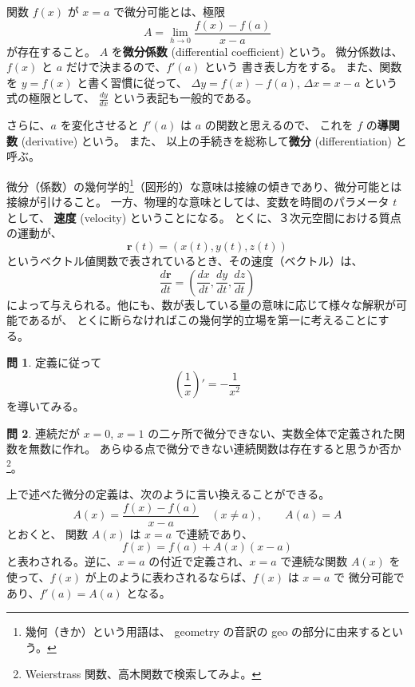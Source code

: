 \documentclass[a4paper]{jsarticle}
\theoremstyle{definition}
\newtheorem{Exercise}{問}%
\theoremstyle{remark}
\begin{document}
関数 $f(x)$ が $x=a$ で微分可能とは、極限
\[
A = \lim_{h\to 0} \frac{f(x)-f(a)}{x-a}
\]
が存在すること。
$A$ を{\bf 微分係数} (differential coefficient) という。
微分係数は、$f(x)$ と $a$ だけで決まるので、$f'(a)$ という
書き表し方をする。
また、関数を $y = f(x)$ と書く習慣に従って、
$\Delta y = f(x) - f(a)$, $\Delta x = x-a$ という式の極限として、
$\displaystyle \frac{dy}{dx}$ という表記も一般的である。

さらに、$a$ を変化させると $f'(a)$ は $a$ の関数と思えるので、
これを $f$ の{\bf 導関数} (derivative) という。
また、
以上の手続きを総称して{\bf 微分} (differentiation) と
呼ぶ。

微分（係数）の幾何学的\footnote{幾何（きか）という用語は、
geometry の音訳の geo の部分に由来するという。}（図形的）な意味は接線の傾きであり、微分可能とは接線が引けること。
一方、物理的な意味としては、変数を時間のパラメータ $t$ として、
\textbf{速度} (velocity) ということになる。
とくに、３次元空間における質点の運動が、
\[
\mathbf{r}(t) = (x(t), y(t), z(t))
\]
というベクトル値関数で表されているとき、その速度（ベクトル）は、
\[
\frac{d\mathbf{r}}{dt} = \left(
\frac{dx}{dt}, \frac{dy}{dt}, \frac{dz}{dt}
\right)
\]
によって与えられる。他にも、数が表している量の意味に応じて様々な解釈が可能であるが、
とくに断らなければこの幾何学的立場を第一に考えることにする。

\begin{Exercise}
定義に従って
\[
\left(\frac{1}{x}\right)' = - \frac{1}{x^2}
\]
を導いてみる。
\end{Exercise}

\begin{Exercise}
連続だが $x=0$, $x=1$ の二ヶ所で微分できない、実数全体で定義された関数を無数に作れ。
あらゆる点で微分できない連続関数は存在すると思うか否か
\footnote{Weierstrass 関数、高木関数で検索してみよ。}。
\end{Exercise}

上で述べた微分の定義は、次のように言い換えることができる。
\[
  A(x) = \frac{f(x) - f(a)}{x-a} \quad (x \not= a),
  \qquad A(a) = A
\]
とおくと、%
関数 $A(x)$ は $x = a$ で連続であり、
\[
  f(x) = f(a) + A(x)(x-a)
\]
と表わされる。逆に、$x=a$ の付近で定義され、$x=a$ で連続な関数 $A(x)$ を使って、$f(x)$ が上のように表わされるならば、$f(x)$ は $x=a$ で
微分可能であり、$f'(a) = A(a)$ となる。

\end{document}
